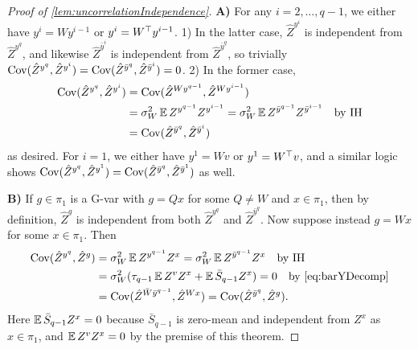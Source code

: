 \documentclass[main.tex]{subfiles}
\begin{document}
\begin{proof}[Proof of \cref{lem:uncorrelationIndependence}]
    \textbf{A) }For any $i=2,\ldots,q-1$, we either have $y^{i}=Wy^{i-1}$ or $y^{i}=W^{\top}y^{i-1}$. 1) In the latter case, $\hat{Z}^{y^{i}}$ is independent from $\hat{Z}^{y^{q}}$, and likewise $\hat{Z}^{\bar{y}^{i}}$ is independent from $\hat{Z}^{\bar{y}^{q}}$, so trivially \emph{$\operatorname{Cov}(\hat{Z}^{y^{q}},\hat{Z}^{y^{i}})=\operatorname{Cov}(\hat{Z}^{\bar{y}^{q}},\hat{Z}^{\bar{y}^{i}})=0$. }2) In the former case,
    \begin{align*}
    \operatorname{Cov}(\hat{Z}^{y^{q}},\hat{Z}^{y^{i}}) & =\operatorname{Cov}(\hat{Z}^{Wy^{q-1}},\hat{Z}^{Wy^{i-1}})\\
     & =\sigma_{W}^{2}\operatorname*{\mathbb{E}} Z^{y^{q-1}}Z^{y^{i-1}}=\sigma_{W}^{2}\operatorname*{\mathbb{E}} Z^{\bar{y}^{q-1}}Z^{\bar{y}^{i-1}}\quad\text{by IH}\\
     & =\operatorname{Cov}(\hat{Z}^{\bar{y}^{q}},\hat{Z}^{\bar{y}^{i}})
    \end{align*}
    as desired. For $i=1$, we either have $y^{1}=Wv$ or $y^{1}=W^{\top}v$, and a similar logic shows $\operatorname{Cov}(\hat{Z}^{y^{q}},\hat{Z}^{y^{1}})=\operatorname{Cov}(\hat{Z}^{\bar{y}^{q}},\hat{Z}^{\bar{y}^{1}})$ as well.
    
    \textbf{B) }If $g\in\pi_{1}$ is a G-var with $g=Qx$ for some $Q\ne W$ and $x\in\pi_{1}$, then by definition, $\hat{Z}^{g}$ is independent from both $\hat{Z}^{y^{q}}$ and $\hat{Z}^{\bar{y}^{q}}$. Now suppose instead $g=Wx$ for some $x\in\pi_{1}$. Then
    \begin{align*}
    \Cov(\hat{Z}^{y^{q}},\hat{Z}^{g}) & =\sigma_{W}^{2}\EV Z^{y^{q-1}}Z^{x}=\sigma_{W}^{2}\EV Z^{\bar{y}^{q-1}}Z^{x}\quad\text{by IH}\\
     & =\sigma_{W}^{2}(\tau_{q-1}\EV Z^{v}Z^{x}+\EV\bar{S}_{q-1}Z^{x})=0\quad\text{by \cref{eq:barYDecomp}}\\
     & =\Cov(\hat{Z}^{\bar{W}\bar{y}^{q-1}},\hat{Z}^{Wx})=\Cov(\hat{Z}^{\bar{y}^{q}},\hat{Z}^{g}).
    \end{align*}
    Here $\operatorname*{\mathbb{E}}\bar{S}_{q-1}Z^{x}=0$ because $\bar{S}_{q-1}$ is zero-mean and independent from $Z^{x}$ as $x\in\pi_{1}$, and $\operatorname*{\mathbb{E}} Z^{v}Z^{x}=0$ by the premise of this theorem. 
    

\end{proof}
\end{document}
